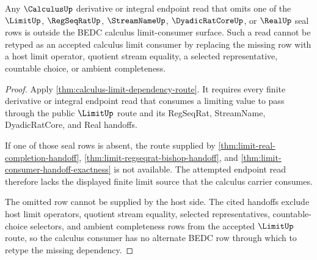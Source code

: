 \begin{theorem}
\label{thm:calculus-limit-dependency-refusal-boundary}
Any $\CalculusUp$ derivative or integral endpoint read that omits one of the $\LimitUp$, $\RegSeqRatUp$, $\StreamNameUp$, $\DyadicRatCoreUp$, or $\RealUp$ seal rows is outside the BEDC calculus limit-consumer surface. Such a read cannot be retyped as an accepted calculus limit consumer by replacing the missing row with a host limit operator, quotient stream equality, a selected representative, countable choice, or ambient completeness.
\end{theorem}
\begin{proof}
Apply \autoref{thm:calculus-limit-dependency-route}. It requires every finite derivative or integral endpoint read that consumes a limiting value to pass through the public $\LimitUp$ route and its RegSeqRat, StreamName, DyadicRatCore, and Real handoffs.

If one of those seal rows is absent, the route supplied by \autoref{thm:limit-real-completion-handoff}, \autoref{thm:limit-regseqrat-bishop-handoff}, and \autoref{thm:limit-consumer-handoff-exactness} is not available. The attempted endpoint read therefore lacks the displayed finite limit source that the calculus carrier consumes.

The omitted row cannot be supplied by the host side. The cited handoffs exclude host limit operators, quotient stream equality, selected representatives, countable-choice selectors, and ambient completeness rows from the accepted $\LimitUp$ route, so the calculus consumer has no alternate BEDC row through which to retype the missing dependency.
\end{proof}
